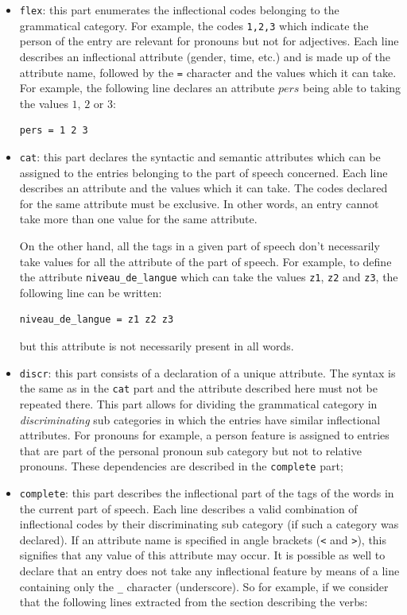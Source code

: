 \begin{itemize}
  \item \verb$flex$: this part enumerates the inflectional
  codes belonging to the grammatical category. For example, the codes
  \verb$1,2,3$ which indicate the person of the entry are relevant for pronouns
  but not for adjectives. Each line describes an inflectional attribute (gender,
  time, etc.) and is made up of the attribute name, followed by the \verb$=$
  character and the values which it can take. For example, the following line
  declares an attribute $pers$ being able to taking the values $1$, $2$ or $3$:

\begin{verbatim}
pers = 1 2 3
\end{verbatim}

\item \verb$cat$: this part declares the syntactic and semantic
attributes which can be assigned to the entries belonging to the part of speech
concerned. Each line describes an attribute and the values which it can take. The
codes declared for the same attribute must be exclusive. In other words, an entry
cannot take more than one value for the same attribute.

On the other hand, all the tags in a given part of speech don't necessarily take
values for all the attribute of the part of speech. For example, to define the
attribute \verb$niveau_de_langue$ which can take the values \verb$z1$, \verb$z2$
and \verb$z3$, the following line can be written:


\begin{verbatim}
niveau_de_langue = z1 z2 z3
\end{verbatim}

but this attribute is not necessarily present in all words.

\item \verb$discr$: this part consists of a declaration of a
unique attribute. The syntax is the same as in the \verb$cat$ part and the
attribute described here must not be repeated there. This part allows for
dividing the grammatical category in \textit{discriminating} sub categories in
which the entries have similar inflectional attributes. For pronouns for example,
a person feature is assigned to entries that are part of the personal pronoun sub
category but not to relative pronouns. These dependencies are described in the
\verb$complete$ part;

\item \verb$complete$: this part describes the
inflectional part of the tags of the words in the current part of speech. Each
line describes a valid combination of inflectional codes by their discriminating
sub category (if such a category was declared). If an attribute name is specified
in angle brackets (\verb$<$ and \verb$>$), this signifies that any value of this
attribute may occur. It is possible as well to declare that an entry does not
take any inflectional feature by means of a line containing only the \verb$_$
character (underscore).\index{\verb$_$} So for example, if we consider that the
following lines extracted from the section describing the verbs:



\end{itemize}
